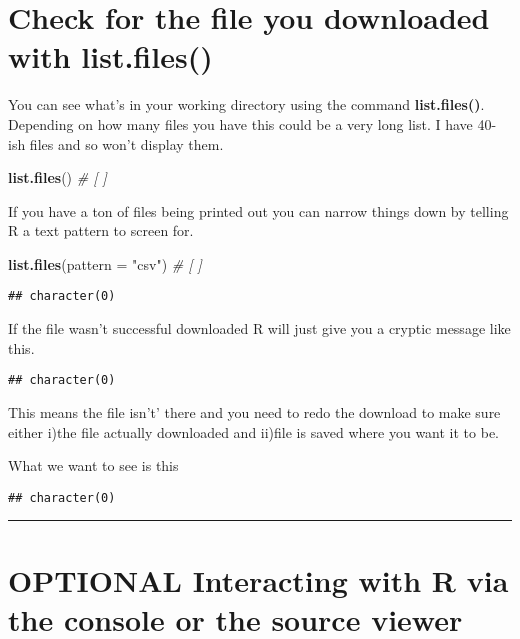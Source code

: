 \documentclass[]{book}
\newenvironment{Shaded}{\begin{snugshade}}{\end{snugshade}}
\newcommand{\KeywordTok}[1]{\textcolor[rgb]{0.13,0.29,0.53}{\textbf{#1}}}
\newcommand{\DataTypeTok}[1]{\textcolor[rgb]{0.13,0.29,0.53}{#1}}
\newcommand{\StringTok}[1]{\textcolor[rgb]{0.31,0.60,0.02}{#1}}
\newcommand{\CommentTok}[1]{\textcolor[rgb]{0.56,0.35,0.01}{\textit{#1}}}
\newcommand{\NormalTok}[1]{#1}
\theoremstyle{definition}
\theoremstyle{definition}
\theoremstyle{definition}
\theoremstyle{remark}
\begin{document}
\section{Check for the file you downloaded with
list.files()}\label{check-for-the-file-you-downloaded-with-list.files}

You can see what's in your working directory using the command
\textbf{list.files()}. Depending on how many files you have this could
be a very long list. I have 40-ish files and so won't display them.

\begin{Shaded}
\begin{Highlighting}[]
\KeywordTok{list.files}\NormalTok{() }\CommentTok{# [ ]}
\end{Highlighting}
\end{Shaded}

If you have a ton of files being printed out you can narrow things down
by telling R a text pattern to screen for.

\begin{Shaded}
\begin{Highlighting}[]
\KeywordTok{list.files}\NormalTok{(}\DataTypeTok{pattern =} \StringTok{"csv"}\NormalTok{) }\CommentTok{# [ ]}
\end{Highlighting}
\end{Shaded}

\begin{verbatim}
## character(0)
\end{verbatim}

If the file wasn't successful downloaded R will just give you a cryptic
message like this.

\begin{verbatim}
## character(0)
\end{verbatim}

This means the file isn't' there and you need to redo the download to
make sure either i)the file actually downloaded and ii)file is saved
where you want it to be.

What we want to see is this

\begin{verbatim}
## character(0)
\end{verbatim}

\begin{center}\rule{0.5\linewidth}{\linethickness}\end{center}

\section{OPTIONAL Interacting with R via the console or the source
viewer}\label{optional-interacting-with-r-via-the-console-or-the-source-viewer}
\end{document}
